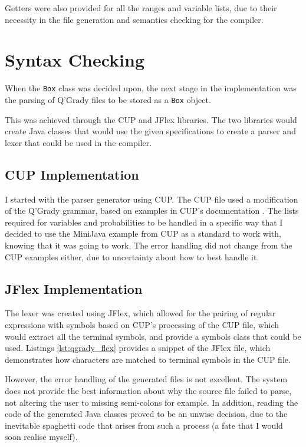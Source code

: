 \documentclass[report.tex]{subfiles}
\begin{document}
Getters were also provided for all the ranges and variable lists, due to their
necessity in the file generation and semantics checking for the compiler.

\section{Syntax Checking} %
\label{sec:syntax_checking}
When the \texttt{Box} class was decided upon, the next stage in the
implementation was the parsing of Q'Grady files to be stored as a \texttt{Box}
object.

This was achieved through the CUP and JFlex libraries. The two libraries would
create Java classes that would use the given specifications to create a parser
and lexer that could be used in the compiler.

\subsection{CUP Implementation} %
\label{sub:cup_impl}
I started with the parser generator using CUP. The CUP file used a modification
of the Q'Grady grammar, based on examples in CUP's documentation 
\cite{cup_example}. The lists required for variables and probabilities to be
handled in a specific way that I decided to use the MiniJava example from CUP
as a standard to work with, knowing that it was going to work. The error
handling did not change from the CUP examples either, due to uncertainty about
how to best handle it.

\subsection{JFlex Implementation} %
\label{sub:jflex_impl}
The lexer was created using JFlex, which allowed for the pairing of regular
expressions with symbols based on CUP's processing of the CUP file, which would
extract all the terminal symbols, and provide a symbols class that could be
used. Listings \ref{lst:qgrady_flex} provides a snippet of the JFlex file, which
demonstrates how characters are matched to terminal symbols in the CUP file.

 


However, the error handling of the generated files is not excellent. The system
does not provide the best information about why the source file failed to parse,
not altering the user to missing semi-colons for example. In addition, reading
the code of the generated Java classes proved to be an unwise decision, due to
the inevitable spaghetti code that arises from such a process (a fate that I
would soon realise myself).
\end{document}
